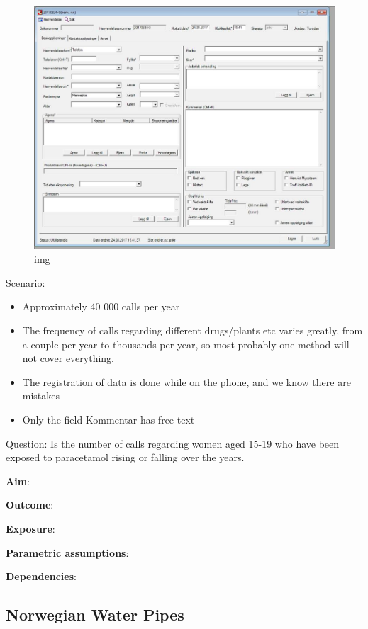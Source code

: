 \documentclass[12pt,]{article}
\providecommand{\tightlist}{%
  \setlength{\itemsep}{0pt}\setlength{\parskip}{0pt}}
\begin{document}
\begin{figure}
\centering
\includegraphics{resources/poisons_information_center.jpg}
\caption{img}
\end{figure}

Scenario:

\begin{itemize}
\tightlist
\item
  Approximately 40 000 calls per year
\item
  The frequency of calls regarding different drugs/plants etc varies
  greatly, from a couple per year to thousands per year, so most
  probably one method will not cover everything.
\item
  The registration of data is done while on the phone, and we know there
  are mistakes
\item
  Only the field Kommentar has free text
\end{itemize}

Question: Is the number of calls regarding women aged 15-19 who have
been exposed to paracetamol rising or falling over the years.

\textbf{Aim}:

\textbf{Outcome}:

\textbf{Exposure}:

\textbf{Parametric assumptions}:

\textbf{Dependencies}:

\subsection{Norwegian Water Pipes}\label{norwegian-water-pipes}
\end{document}
